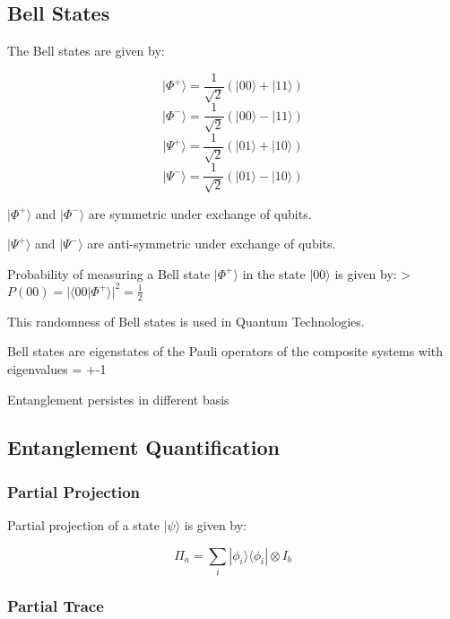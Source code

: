 \documentclass[
  letterpaper,
  DIV=11,
  numbers=noendperiod]{scrreprt}
\begin{document}
\subsection*{Bell States}\label{bell-states}

The Bell states are given by:

\[ |\Phi^+\rangle = \frac{1}{\sqrt{2}} (|00\rangle + |11\rangle)\]
\[ |\Phi^-\rangle = \frac{1}{\sqrt{2}} (|00\rangle - |11\rangle)\]
\[ |\Psi^+\rangle = \frac{1}{\sqrt{2}} (|01\rangle + |10\rangle)\]
\[ |\Psi^-\rangle = \frac{1}{\sqrt{2}} (|01\rangle - |10\rangle)\]

\(|\Phi^+\rangle\) and \(|\Phi^-\rangle\) are symmetric under exchange
of qubits.

\(|\Psi^+\rangle\) and \(|\Psi^-\rangle\) are anti-symmetric under
exchange of qubits.

Probability of measuring a Bell state \(|\Phi^+\rangle\) in the state
\(|00\rangle\) is given by: \textgreater{}
\(P(00) = |\langle 00 | \Phi^+ \rangle|^2 = \frac{1}{2}\)

This randomness of Bell states is used in Quantum Technologies.

Bell states are eigenstates of the Pauli operators of the composite
systems with eigenvalues = +-1

Entanglement persistes in different basis

\subsection*{Entanglement
Quantification}\label{entanglement-quantification}

\subsubsection*{Partial Projection}\label{partial-projection}

Partial projection of a state \(|\psi\rangle\) is given by:

\[ \Pi_a = \sum_{i} |\phi_i\rangle \langle \phi_i | \otimes I_b \]

\subsubsection*{Partial Trace}\label{partial-trace}
\end{document}
